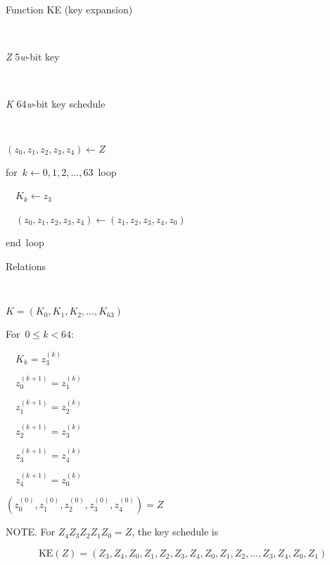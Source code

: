 \documentclass[a4paper,oneside,english]{amsart}
\numberwithin{equation}{section}
\numberwithin{figure}{section}
\newenvironment{lyxlist}[1]
{\begin{list}{}
{\settowidth{\labelwidth}{#1}
 \setlength{\leftmargin}{\labelwidth}
 \addtolength{\leftmargin}{\labelsep}
 \renewcommand{\makelabel}[1]{##1\hfil}}}
{\end{list}}
\newenvironment{lyxcode}
{\par\begin{list}{}{
\setlength{\rightmargin}{\leftmargin}
\setlength{\listparindent}{0pt}\raggedright
\setlength{\itemsep}{0pt}
\setlength{\parsep}{0pt}
\normalfont\ttfamily}\item[]}
{\end{list}}
\begin{document}
\begin{algorithm}


\caption{\label{alg:Function-KE}Function KE (key expansion)}

\begin{description}
\item [{Input}]~

\begin{lyxlist}{00.00.0000}
\item [{\emph{Z}}] 5\emph{w}-bit key
\end{lyxlist}
\item [{Output}]~

\begin{lyxlist}{00.00.0000}
\item [{\emph{K}}] 64\emph{w}-bit key schedule
\end{lyxlist}
\item [{Pseudo-code}]~\end{description}
\begin{lyxcode}
$(z_{0},z_{1},z_{2},z_{3},z_{4})\leftarrow Z$

for~$k\leftarrow0,1,2,\ldots,63$~loop

~~$K_{k}\leftarrow z_{3}$

~~$(z_{0},z_{1},z_{2},z_{3},z_{4})\leftarrow(z_{1},z_{2},z_{3},z_{4},z_{0})$

end~loop\end{lyxcode}
\begin{description}
\item [{Relations}]~\end{description}
\begin{lyxcode}
$K=(K_{0},K_{1},K_{2},\ldots,K_{63})$

For~$0\leqslant k<64$:~

~~$K_{k}=z_{3}^{(k)}$

~~$z_{0}^{(k+1)}=z_{1}^{(k)}$

~~$z_{1}^{(k+1)}=z_{2}^{(k)}$

~~$z_{2}^{(k+1)}=z_{3}^{(k)}$

~~$z_{3}^{(k+1)}=z_{4}^{(k)}$

~~$z_{4}^{(k+1)}=z_{0}^{(k)}$

$(z_{0}^{(0)},z_{1}^{(0)},z_{2}^{(0)},z_{3}^{(0)},z_{4}^{(0)})=Z$\end{lyxcode}
\end{algorithm}


NOTE. For $Z_{4}Z_{3}Z_{2}Z_{1}Z_{0}=Z$, the key schedule is

\[
\mathrm{KE}(Z)=(Z_{3},Z_{4},Z_{0},Z_{1},Z_{2},Z_{3},Z_{4},Z_{0},Z_{1},Z_{2},\ldots,Z_{3},Z_{4},Z_{0},Z_{1})
\]
\end{document}

